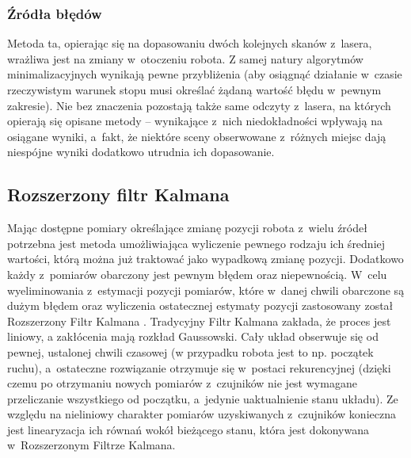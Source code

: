 \subsubsection{Źródła błędów}

Metoda ta, opierając się na dopasowaniu dwóch kolejnych skanów z~lasera,
wrażliwa jest na zmiany w~otoczeniu robota. Z samej natury algorytmów
minimalizacyjnych wynikają pewne przybliżenia (aby osiągnąć działanie w~czasie
rzeczywistym warunek stopu musi określać żądaną wartość błędu w~pewnym
zakresie). Nie bez znaczenia pozostają także same odczyty z~lasera, na których
opierają się opisane metody -- wynikające z~nich niedokładności wpływają na
osiągane wyniki, a~fakt, że niektóre sceny obserwowane z~różnych miejsc dają
niespójne wyniki dodatkowo utrudnia ich dopasowanie.

\subsection{Rozszerzony filtr Kalmana}

Mając dostępne pomiary określające zmianę pozycji robota z~wielu źródeł potrzebna jest metoda
umożliwiająca wyliczenie pewnego rodzaju ich średniej wartości, którą można już traktować
jako wypadkową zmianę pozycji. Dodatkowo każdy z~pomiarów obarczony jest pewnym błędem oraz
niepewnością. W~celu wyeliminowania z~estymacji pozycji pomiarów, które w~danej chwili
obarczone są dużym błędem oraz wyliczenia ostatecznej estymaty pozycji zastosowany został
Rozszerzony Filtr Kalmana \cite{Thrun:2005:PR:1121596}. Tradycyjny Filtr Kalmana zakłada, że proces jest
liniowy, a zakłócenia mają rozkład Gaussowski. Cały układ obserwuje się od pewnej,
ustalonej chwili czasowej (w przypadku robota jest to np. początek ruchu), a~ostateczne
rozwiązanie otrzymuje się w~postaci rekurencyjnej (dzięki czemu po otrzymaniu nowych pomiarów
z~czujników nie jest wymagane przeliczanie wszystkiego od początku, a~jedynie uaktualnienie
stanu układu). Ze względu na nieliniowy charakter pomiarów uzyskiwanych z~czujników
konieczna jest linearyzacja ich równań wokół bieżącego stanu, która jest dokonywana 
w~Rozszerzonym Filtrze Kalmana.

